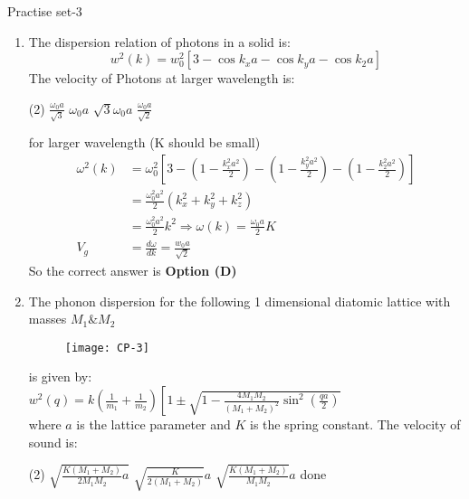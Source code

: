 \newpage
\begin{abox}
	Practise set-3
\end{abox}
\begin{enumerate}
	\item 
	The dispersion relation of photons in a solid is:
	$$
	w^{2}(k)=w_{0}^{2}\left[3-\cos k_{x} a-\cos k_{y} a-\cos k_{2} a\right]
	$$
	The velocity of Photons at larger wavelength is:
	\begin{tasks}(2)
		\task[\textbf{a.}] $\frac{\omega_{0} a}{\sqrt{3}}$
		\task[\textbf{b.}]$\omega_{0} a$
		\task[\textbf{c.}]$\sqrt{3} \omega_{0} a$
		\task[\textbf{d.}] $\frac{\omega_{0} a}{\sqrt{2}}$
	\end{tasks}
\begin{answer}
	for larger wavelength (K should be small) 
	\begin{align*}
	\omega^{2}(k)&=\omega_{0}^{2}\left[3-\left(1-\frac{k_{x}^{2} a^{2}}{2}\right)-\left(1-\frac{k_{y}^{2} a^{2}}{2}\right)-\left(1-\frac{k_{2}^{2} a^{2}}{2}\right)\right]\\
	&=\frac{\omega_{0}^{2} a^{2}}{2}\left(k_{x}^{2}+k_{y}^{2}+k_{z}^{2}\right) \\
	&=\frac{\omega_{0}^{2} a^{2}}{2} k^{2} \Rightarrow \omega(k)=\frac{\omega_{0} a}{2} K\\
	V_{g}&=\frac{d \omega}{d k}=\frac{w_{0} a}{\sqrt{2}}
	\end{align*}
	So the correct answer is \textbf{Option (D)}
\end{answer}
\item 
	The phonon dispersion for the following 1 dimensional diatomic lattice with masses $M_{1} \& M_{2}$
	\begin{figure}[H]
		\centering
		\texttt{[image: CP-3]}
	\end{figure}
	is given by:\\
	$w^{2}(q)=k\left(\frac{1}{m_{1}}+\frac{1}{m_{2}}\right)\left[1 \pm \sqrt{1-\frac{4 M_{1} M_{2}}{\left(M_{1}+M_{2}\right)^{2}} \sin ^{2}\left(\frac{q a}{2}\right)}\right.$\\
	where $a$ is the lattice parameter and $K$ is the spring constant. The velocity of sound is:
\begin{tasks}(2)
	\task[\textbf{a.}]$\sqrt{\frac{K\left(M_{1}+M_{2}\right)}{2 M_{1} M_{2}} a}$
	\task[\textbf{b.}]$\sqrt{\frac{K}{2\left(M_{1}+M_{2}\right)}} a$
	\task[\textbf{c.}]$\sqrt{\frac{K\left(M_{1}+M_{2}\right)}{M_{1} M_{2}}} a$
	\task[\textbf{d.}] done
\end{tasks}
\begin{answer}

\end{answer}
\end{enumerate}
